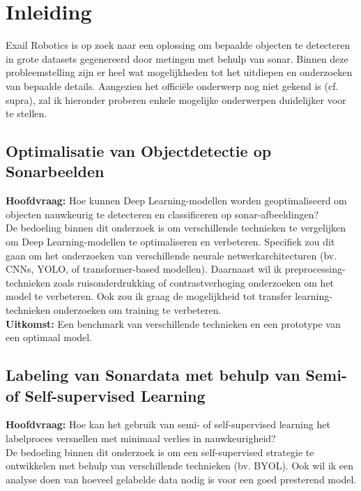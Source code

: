 
\section{Inleiding}%
\label{sec:inleiding}

Exail Robotics is op zoek naar een oplossing om bepaalde objecten te detecteren in grote datasets gegenereerd door metingen met behulp van sonar. Binnen deze probleemstelling zijn er heel wat mogelijkheden tot het uitdiepen en onderzoeken van bepaalde details. Aangezien het officiële onderwerp nog niet gekend is (cf. supra), zal ik hieronder proberen enkele mogelijke onderwerpen duidelijker voor te stellen.

\subsection{Optimalisatie van Objectdetectie op Sonarbeelden}

\textbf{Hoofdvraag:} Hoe kunnen Deep Learning-modellen worden geoptimaliseerd om objecten nauwkeurig te detecteren en classificeren op sonar-afbeeldingen? \\

De bedoeling binnen dit onderzoek is om verschillende technieken te vergelijken om Deep Learning-modellen te optimaliseren en verbeteren. Specifiek zou dit gaan om het onderzoeken van verschillende neurale netwerkarchitecturen (bv. CNNs, YOLO, of transformer-based modellen). Daarnaast wil ik preprocessing-technieken zoals ruisonderdrukking of contrastverhoging onderzoeken om het model te verbeteren. Ook zou ik graag de mogelijkheid tot transfer learning-technieken onderzoeken om training te verbeteren. \\

\textbf{Uitkomst:} Een benchmark van verschillende technieken en een prototype van een optimaal model.

\subsection{Labeling van Sonardata met behulp van Semi- of Self-supervised Learning}

\textbf{Hoofdvraag:} Hoe kan het gebruik van semi- of self-supervised learning het labelproces versnellen met minimaal verlies in nauwkeurigheid? \\

De bedoeling binnen dit onderzoek is om een self-supervised strategie te ontwikkelen met behulp van verschillende technieken (bv. BYOL). Ook wil ik een analyse doen van hoeveel gelabelde data nodig is voor een goed presterend model. \\

